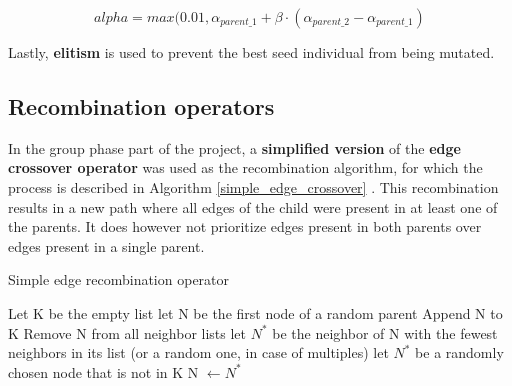 \documentclass[a4paper,10pt]{article}
\newcommand{\ReplaceMe}[1]{{\color{blue}#1}}
\begin{document}
\begin{equation}
    \label{crossover_alpha_2}
    alpha = max(0.01, \alpha_{parent\_1} + \beta \cdot (\alpha_{parent\_2} - \alpha_{parent\_1})
\end{equation}

Lastly, \textbf{elitism} is used to prevent the best seed individual from being mutated.

\subsection{Recombination operators}
\label{recombination}

In the group phase part of the project, a \textbf{simplified version} of the \textbf{edge crossover operator} was used as the recombination algorithm, for which the process is described in Algorithm \ref{simple_edge_crossover} \cite{initial_implementation_edge_crossover}. This recombination results in a new path where all edges of the child were present in at least one of the parents. It does however not prioritize edges present in both parents over edges present in a single parent.

\begin{algorithm}
\caption{Simple edge recombination operator}\label{simple_edge_crossover}
\begin{algorithmic}
\State Let K be the empty list
\State let N be the first node of a random parent
\State Append N to K
\State Remove N from all neighbor lists
\State let $N^*$ be the neighbor of N with the fewest neighbors in its list (or a random one, in case of multiples)
\Else 
\State let $N^*$ be a randomly chosen node that is not in K
\EndIf
\State N $\gets N^*$
\EndWhile
\end{algorithmic}
\end{algorithm}
\end{document}
